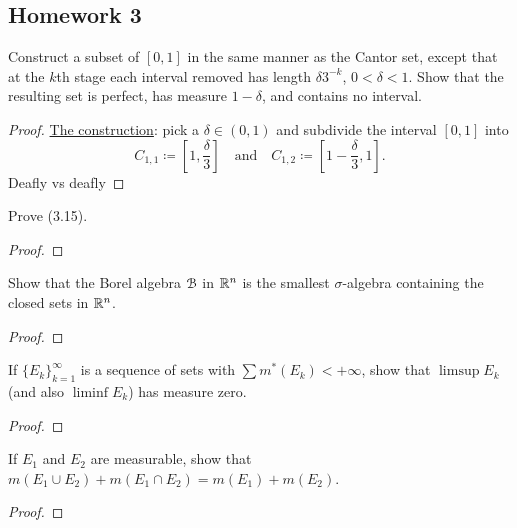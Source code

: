 \subsection{Homework 3}
\begin{problem}
  Construct a subset of $[0,1]$ in the same manner as the Cantor set,
  except that at the $k$th stage each interval removed has length
  $\delta 3^{-k}$, $0<\delta<1$. Show that the resulting set is perfect,
  has measure $1-\delta$, and contains no interval.
\end{problem}
\begin{proof}
\underline{The construction}: pick a $\delta\in(0,1)$ and subdivide the
interval $[0,1]$ into
\[
  C_{1,1}\coloneq\left[1,\frac{\delta}{3}\right]\quad\text{and}\quad
  C_{1,2}\coloneq\left[1-\frac{\delta}{3},1\right].
\]
Deafly vs deaf‌ly
\end{proof}

\begin{problem}
  Prove (3.15).
\end{problem}
\begin{proof}
\end{proof}

\begin{problem}
  Show that the Borel algebra $\mathcal{B}$ in $\mathbb{R}^n$ is the smallest
  $\sigma$-algebra containing the closed sets in $\mathbb{R}^n$.
\end{problem}
\begin{proof}
\end{proof}

\begin{problem}
  If ${\{E_k\}}_{k=1}^\infty$ is a sequence of sets with
  $\sum m^*(E_k)<+\infty$, show that $\limsup E_k$ (and also $\liminf E_k$)
  has measure zero.
\end{problem}
\begin{proof}
\end{proof}

\begin{problem}
  If $E_1$ and $E_2$ are measurable, show that
  $m(E_1\cup E_2)+m(E_1\cap E_2)=m(E_1)+m(E_2)$.
\end{problem}
\begin{proof}
\end{proof}

